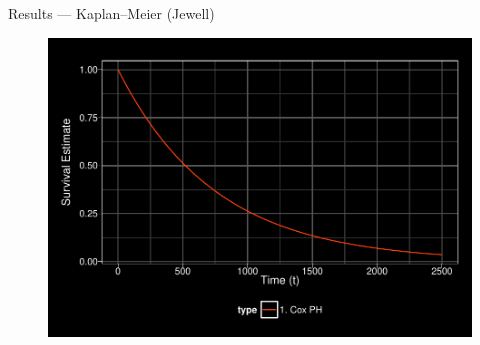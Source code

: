 \documentclass[12pt,t,handout]{beamer}
\begin{document}
\begin{frame}[c]{Results --- Kaplan--Meier (Jewell)}

\begin{center}
\begin{figure}[H]
\begin{center}
\includegraphics[width=\textwidth]{Figs/s1_cox.pdf}
\end{center}
\label{fig:s1_cox}
\end{figure}
\end{center}

\note{
}

\end{frame}

\end{document}
